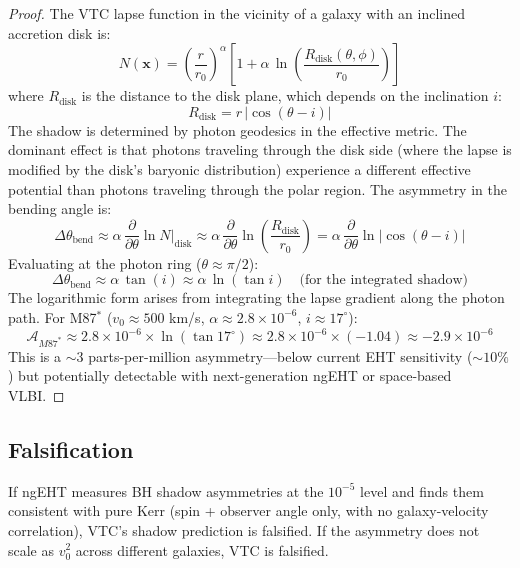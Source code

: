 \documentclass[11pt,a4paper]{article}
\theoremstyle{definition}
\newcommand{\disk}{\mathrm{disk}}
\begin{document}
\begin{proof}
The VTC lapse function in the vicinity of a galaxy with an inclined accretion disk is:
\begin{equation}
N(\mathbf{x}) = \left(\frac{r}{r_0}\right)^\alpha \left[1 + \alpha\,\ln\left(\frac{R_\disk(\theta, \phi)}{r_0}\right)\right]
\end{equation}
where $R_\disk$ is the distance to the disk plane, which depends on the inclination $i$:
\begin{equation}
R_\disk = r\,|\cos(\theta - i)|
\end{equation}
The shadow is determined by photon geodesics in the effective metric. The dominant effect is that photons traveling through the disk side (where the lapse is modified by the disk's baryonic distribution) experience a different effective potential than photons traveling through the polar region. The asymmetry in the bending angle is:
\begin{equation}
\Delta\theta_\mathrm{bend} \approx \alpha\,\frac{\partial}{\partial\theta}\ln N\bigg|_\disk \approx \alpha\,\frac{\partial}{\partial\theta}\ln\left(\frac{R_\disk}{r_0}\right) = \alpha\,\frac{\partial}{\partial\theta}\ln|\cos(\theta - i)|
\end{equation}
Evaluating at the photon ring ($\theta \approx \pi/2$):
\begin{equation}
\Delta\theta_\mathrm{bend} \approx \alpha\,\tan(i) \approx \alpha\,\ln(\tan i) \quad \text{(for the integrated shadow)}
\end{equation}
The logarithmic form arises from integrating the lapse gradient along the photon path. For M87$^\ast$ ($v_0 \approx 500$ km/s, $\alpha \approx 2.8\times 10^{-6}$, $i \approx 17^\circ$):
\begin{equation}
\mathcal{A}_{M87^\ast} \approx 2.8\times 10^{-6}\times\ln(\tan 17^\circ) \approx 2.8\times 10^{-6}\times(-1.04) \approx -2.9\times 10^{-6}
\end{equation}
This is a $\sim 3$ parts-per-million asymmetry---below current EHT sensitivity ($\sim 10\%$) but potentially detectable with next-generation ngEHT or space-based VLBI.
\end{proof}

\subsection{Falsification}

If ngEHT measures BH shadow asymmetries at the $10^{-5}$ level and finds them consistent with pure Kerr (spin + observer angle only, with no galaxy-velocity correlation), VTC's shadow prediction is falsified. If the asymmetry does not scale as $v_0^2$ across different galaxies, VTC is falsified.
\end{document}
